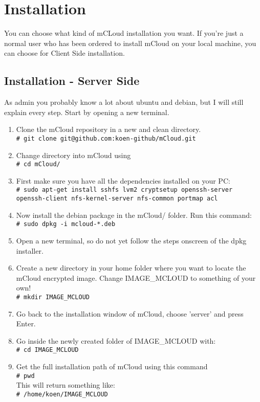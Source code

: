 \documentclass{article}
\newcommand{\shellcmd}[1]{\\\indent\indent\texttt{\footnotesize\# #1}\\}
\begin{document}
\section{Installation}
You can choose what kind of mCLoud installation you want. If you're just a normal user who has been ordered to install mCloud on your local machine, you can choose for Client Side installation.  

\subsection{Installation - Server Side}
As admin you probably know a lot about ubuntu and debian, but I will still explain every step.
Start by opening a new terminal.

\begin{enumerate}
     
    \item Clone the mCloud repository in a new and clean directory.
    \shellcmd{git clone git@github.com:koen-github/mCloud.git}
    \item Change directory into mCloud using
    \shellcmd{cd mCloud/}
    \item First make sure you have all the dependencies installed on your PC:
    \shellcmd{sudo apt-get install sshfs lvm2 cryptsetup openssh-server openssh-client nfs-kernel-server nfs-common portmap acl}
    \item Now install the debian package in the mCloud/ folder. Run this command:
    \shellcmd{sudo dpkg -i mcloud-*.deb}
    
    \item Open a new terminal, so do not yet follow the steps onscreen of the dpkg installer.
    
    \item Create a new directory in your home folder where you want to locate the mCloud encrypted image.
    Change IMAGE\_MCLOUD to something of your own!
    \shellcmd{mkdir IMAGE\_MCLOUD}
    
    \item Go back to the installation window of mCloud, choose 'server' and press Enter.
    \item Go inside the newly created folder of IMAGE\_MCLOUD with: \shellcmd{cd IMAGE\_MCLOUD}
    
    \item Get the full installation path of mCloud using this command \shellcmd{pwd} This will return something like: 
    \shellcmd{/home/koen/IMAGE\_MCLOUD}
    

\end{enumerate}
\end{document}
